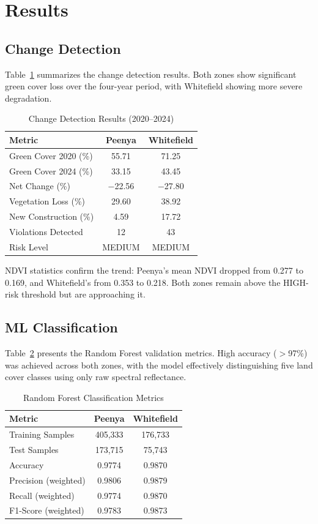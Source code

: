 \documentclass[conference,10pt]{IEEEtran}
\begin{document}
\section{Results}

\subsection{Change Detection}

Table~\ref{tab:change} summarizes the change detection results. Both zones show significant green cover loss over the four-year period, with Whitefield showing more severe degradation.

\begin{table}[t]
\centering
\caption{Change Detection Results (2020--2024)}
\label{tab:change}
\begin{tabular}{lcc}
\toprule
\textbf{Metric} & \textbf{Peenya} & \textbf{Whitefield} \\
\midrule
Green Cover 2020 (\%) & 55.71 & 71.25 \\
Green Cover 2024 (\%) & 33.15 & 43.45 \\
Net Change (\%) & $-$22.56 & $-$27.80 \\
Vegetation Loss (\%) & 29.60 & 38.92 \\
New Construction (\%) & 4.59 & 17.72 \\
Violations Detected & 12 & 43 \\
Risk Level & MEDIUM & MEDIUM \\
\bottomrule
\end{tabular}
\end{table}

NDVI statistics confirm the trend: Peenya's mean NDVI dropped from 0.277 to 0.169, and Whitefield's from 0.353 to 0.218. Both zones remain above the HIGH-risk threshold but are approaching it.

\subsection{ML Classification}

Table~\ref{tab:ml} presents the Random Forest validation metrics. High accuracy ($>$97\%) was achieved across both zones, with the model effectively distinguishing five land cover classes using only raw spectral reflectance.

\begin{table}[t]
\centering
\caption{Random Forest Classification Metrics}
\label{tab:ml}
\begin{tabular}{lcc}
\toprule
\textbf{Metric} & \textbf{Peenya} & \textbf{Whitefield} \\
\midrule
Training Samples & 405,333 & 176,733 \\
Test Samples & 173,715 & 75,743 \\
Accuracy & 0.9774 & 0.9870 \\
Precision (weighted) & 0.9806 & 0.9879 \\
Recall (weighted) & 0.9774 & 0.9870 \\
F1-Score (weighted) & 0.9783 & 0.9873 \\
\bottomrule
\end{tabular}
\end{table}
\end{document}
